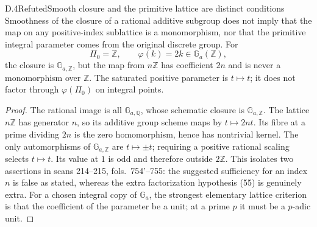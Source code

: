 \begin{statement}{D.4}{Refuted}{Smooth closure and the primitive lattice are distinct conditions}
Smoothness of the closure of a rational additive subgroup does not
imply that the map on any positive-index sublattice is a monomorphism,
nor that the primitive integral parameter comes from the original
discrete group.  For
\[
 \Pi_0=\mathbb Z,\qquad \varphi(k)=2k\in\mathbb G_a(\mathbb Z),
\]
the closure is $\mathbb G_{a,\mathbb Z}$, but the map from $n\mathbb Z$
has coefficient $2n$ and is never a monomorphism over $\mathbb Z$.
The saturated positive parameter is $t\mapsto t$; it does not
factor through $\varphi(\Pi_0)$ on integral points.
\end{statement}
\begin{proof}
The rational image is all $\mathbb G_{a,\mathbb Q}$, whose schematic
closure is $\mathbb G_{a,\mathbb Z}$.  The lattice $n\mathbb Z$
has generator $n$, so its additive group scheme maps by $t\mapsto2nt$.
Its fibre at a prime dividing $2n$ is the zero homomorphism, hence
has nontrivial kernel.  The only automorphisms of
$\mathbb G_{a,\mathbb Z}$ are $t\mapsto\pm t$; requiring a positive
rational scaling selects $t\mapsto t$.  Its value at $1$ is odd
and therefore outside $2\mathbb Z$.  This isolates two assertions
in scans 214--215, fols.~754'--755: the suggested sufficiency for
an index $n$ is false as stated, whereas the extra factorization
hypothesis (55) is genuinely extra.  For a chosen integral copy of
$\mathbb G_a$, the strongest elementary lattice criterion is that
the coefficient of the parameter be a unit; at a prime $p$ it must
be a $p$-adic unit.
\end{proof}


